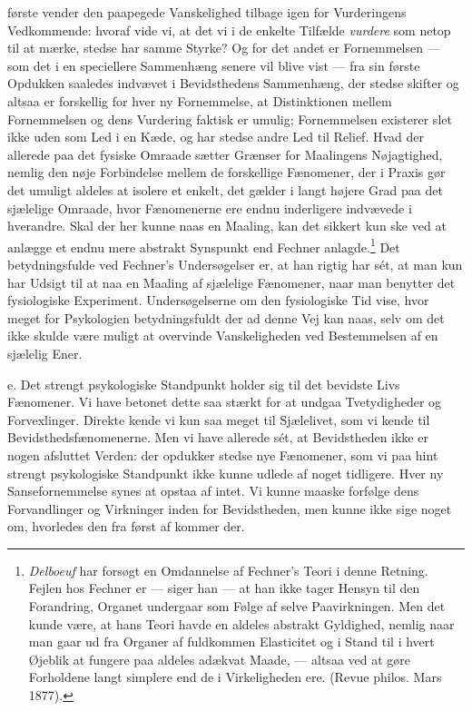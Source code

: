 \documentclass[12pt,a4paper,openany]{book}
\newcommand{\opage}[1]{\marginnote{\footnotesize\textit{[#1]}}}
\begin{document}
første vender den paapegede Vanskelighed tilbage igen for Vurderingens
Vedkommende: hvoraf vide vi, at det vi i de enkelte Tilfælde
\emph{vurdere} som netop til at mærke, stedse har samme Styrke? Og for
det andet er Fornemmelsen --- som det i en speciellere Sammenhæng senere
vil blive vist --- fra sin første Opdukken saaledes indvævet i
Bevidsthedens Sammenhæng, der stedse skifter og altsaa er forskellig for
hver ny Fornemmelse, at Distinktionen mellem Fornemmelsen og dens
Vurdering faktisk er umulig; Fornemmelsen existerer slet ikke uden som
Led i en Kæde, og har stedse andre Led til Relief. Hvad der allerede paa
det fysiske Omraade sætter Grænser for Maalingens Nøjagtighed,
\opage{28}nemlig den nøje Forbindelse mellem de forskellige Fænomener,
der i Praxis gør det umuligt aldeles at isolere et enkelt, det gælder i
langt højere Grad paa det sjælelige Omraade, hvor Fænomenerne ere endnu
inderligere indvævede i hverandre. Skal der her kunne naas en Maaling,
kan det sikkert kun ske ved at anlægge et endnu mere abstrakt Synspunkt
end Fechner anlagde.\footnote[1]{\emph{Delboeuf} har forsøgt en
Omdannelse af Fechner’s Teori i denne Retning. Fejlen hos Fechner er ---
siger han --- at han ikke tager Hensyn til den Forandring, Organet
undergaar som Følge af selve Paavirkningen. Men det kunde være, at hans
Teori havde en aldeles abstrakt Gyldighed, nemlig naar man gaar ud fra
Organer af fuldkommen Elasticitet og i Stand til i hvert Øjeblik at
fungere paa aldeles adækvat Maade, --- altsaa ved at gøre Forholdene
langt simplere end de i Virkeligheden ere. (Revue philos. Mars 1877).}
Det betydningsfulde ved Fechner’s Undersøgelser er, at han rigtig har
sét, at man kun har Udsigt til at naa en Maaling af sjælelige Fænomener,
naar man benytter det fysiologiske Experiment. Undersøgelserne om den
fysiologiske Tid vise, hvor meget for Psykologien betydningsfuldt der ad
denne Vej kan naas, selv om det ikke skulde være muligt at overvinde
Vanskeligheden ved Bestemmelsen af en sjælelig Ener.

e. Det strengt psykologiske Standpunkt holder sig til det bevidste Livs
Fænomener. Vi have betonet dette saa stærkt for at undgaa Tvetydigheder
og Forvexlinger. Direkte kende vi kun saa meget til Sjælelivet, som vi
kende til Bevidsthedsfænomenerne. Men vi have allerede sét, at
Bevidstheden ikke er nogen afsluttet Verden: der opdukker stedse nye
Fænomener, som vi paa hint strengt psykologiske Standpunkt ikke kunne
udlede af noget tidligere. Hver ny Sansefornemmelse synes at opstaa af
intet. Vi kunne maaske forfølge dens Forvandlinger og Virkninger inden
for Bevidstheden, men kunne ikke sige noget om, hvorledes den fra først
af kommer der.
\end{document}
